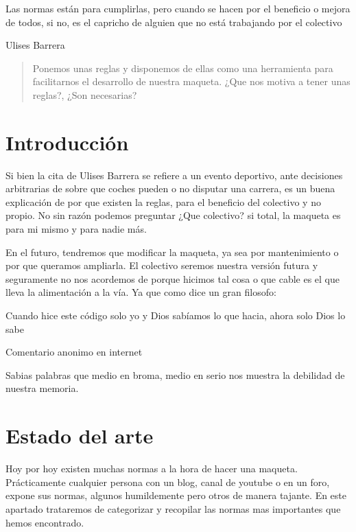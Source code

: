 
\epigraph{Las normas están para cumplirlas, pero cuando se hacen por el beneficio o mejora de todos, si no, es el capricho de alguien que no está trabajando por el colectivo}{Ulises Barrera}

\begin{abstract}
Ponemos unas reglas y disponemos de ellas como una herramienta para facilitarnos el desarrollo de nuestra maqueta. ¿Que nos motiva a tener unas reglas?, ¿Son necesarias?
\end{abstract}

\section{Introducción}
Si bien la cita de Ulises Barrera se refiere a un evento deportivo, ante decisiones arbitrarias de sobre que coches pueden o no disputar una carrera, es un buena explicación de por que existen la reglas, para el beneficio del colectivo y no propio. No sin razón podemos preguntar ¿Que colectivo? si total, la maqueta es para mi mismo y para nadie más.

En el futuro, tendremos que modificar la maqueta, ya sea por mantenimiento o por que queramos ampliarla. El colectivo seremos nuestra versión futura y seguramente no nos acordemos de porque hicimos tal cosa o que cable es el que lleva la alimentación a la vía. Ya que como dice un gran filosofo:

\epigraph{Cuando hice este código solo yo y Dios sabíamos lo que hacia, ahora solo Dios lo sabe}{Comentario anonimo en internet}

Sabias palabras que medio en broma, medio en serio nos muestra la debilidad de nuestra memoria.

\section{Estado del arte}
Hoy por hoy existen muchas normas a la hora de hacer una maqueta. Prácticamente cualquier persona con un blog, canal de youtube o en un foro, expone sus normas, algunos humildemente pero otros de manera tajante. En este apartado trataremos de categorizar y recopilar las normas mas importantes que hemos encontrado.

